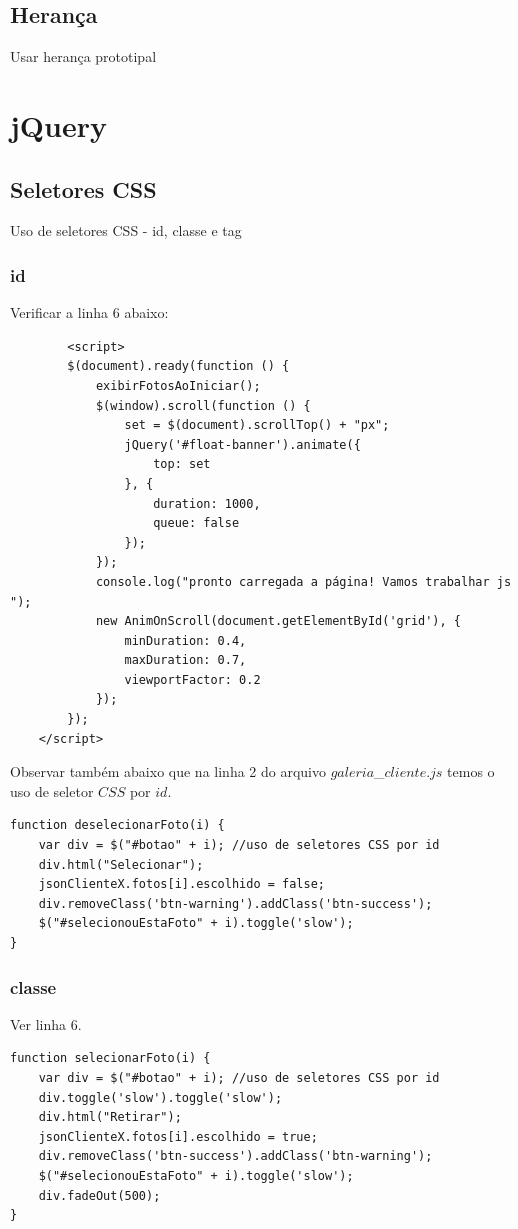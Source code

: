 \subsection{Herança}
Usar herança prototipal


\section{jQuery}
\subsection{Seletores CSS}
	Uso de seletores CSS - id, classe e tag
\subsubsection{id}
	Verificar a linha $6$ abaixo:
		\begin{lstlisting}
	    <script>
        $(document).ready(function () {
            exibirFotosAoIniciar();
            $(window).scroll(function () {
                set = $(document).scrollTop() + "px";
                jQuery('#float-banner').animate({
                    top: set
                }, {
                    duration: 1000,
                    queue: false
                });
            });
            console.log("pronto carregada a página! Vamos trabalhar js ");
            new AnimOnScroll(document.getElementById('grid'), {
                minDuration: 0.4,
                maxDuration: 0.7,
                viewportFactor: 0.2
            });
        });
    </script>
	\end{lstlisting}

	Observar também abaixo que na linha 2 do arquivo $galeria$\_$cliente.js$ temos o uso de seletor $CSS$ por $id$.
	
\begin{lstlisting}
function deselecionarFoto(i) {
    var div = $("#botao" + i); //uso de seletores CSS por id
    div.html("Selecionar");
    jsonClienteX.fotos[i].escolhido = false;
    div.removeClass('btn-warning').addClass('btn-success');
    $("#selecionouEstaFoto" + i).toggle('slow');
}
\end{lstlisting}

\subsubsection{classe}
	Ver linha $6$.
\begin{lstlisting}
function selecionarFoto(i) {
    var div = $("#botao" + i); //uso de seletores CSS por id
    div.toggle('slow').toggle('slow');
    div.html("Retirar");
    jsonClienteX.fotos[i].escolhido = true;
    div.removeClass('btn-success').addClass('btn-warning');
    $("#selecionouEstaFoto" + i).toggle('slow');
    div.fadeOut(500);
}
\end{lstlisting}

